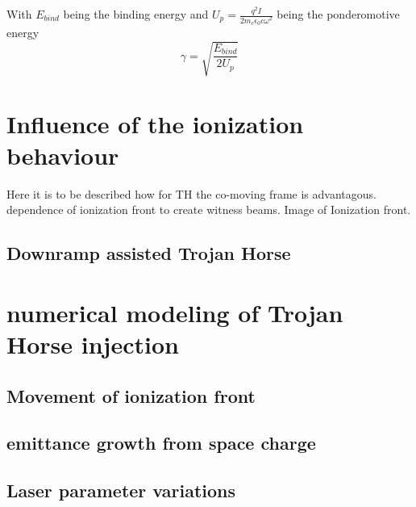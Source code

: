 With $E_{bind}$ being the binding energy and $U_p=\frac{q^2 I}{2 m_e \epsilon_0 c \omega^2}$ being the ponderomotive energy 
\begin{equation}
\gamma=\sqrt{\frac{E_{bind}}{2U_p}}
\end{equation}


\section{Influence of the ionization behaviour}



	Here it is to be described how for TH the co-moving frame is advantagous. dependence of ionization front to 
	create witness beams.
	Image of Ionization front.
	
	


	
\subsection{Downramp assisted Trojan Horse}

\section{numerical modeling of Trojan Horse injection}

\subsection{Movement of ionization front}
\subsection{emittance growth from space charge}
\subsection{Laser parameter variations}
	
